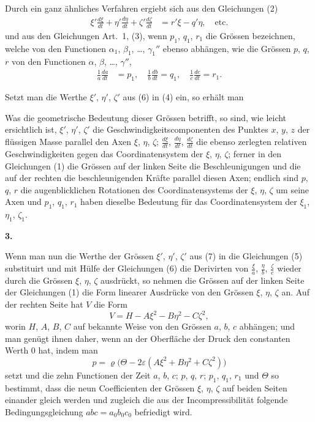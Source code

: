 \documentclass[12pt,a4paper]{book}
\theoremstyle{definition}
\theoremstyle{remark}
\begin{document}
Durch ein ganz \"ahnliches Verfahren ergiebt sich aus den Gleichungen (2)
\begin{align*}
\xi' \frac{d\xi}{dt} + \eta' \frac{d\eta}{dt} + \zeta' \frac{d\zeta}{dt} &= r'\xi - q'\eta,\quad\text{etc.}\tag{5}
\end{align*}
und aus den Gleichungen Art.~1, (3), wenn $p_{1}$, $q_{1}$, $r_{1}$ die Gr\"ossen bezeichnen, welche von den Functionen $\alpha_{1}$, $\beta_{1}$, \dots, $\gamma_{1}''$ ebenso abh\"angen, wie die Gr\"ossen $p$, $q$, $r$ von den Functionen $\alpha$, $\beta$, \dots, $\gamma''$,
\begin{align*}
\frac{1}{a}\frac{da}{dt} &= p_{1},\quad \frac{1}{b}\frac{db}{dt} = q_{1},\quad \frac{1}{c}\frac{dc}{dt} = r_{1}.\tag{6}
\end{align*}

Setzt man die Werthe $\xi'$, $\eta'$, $\zeta'$ aus (6) in (4) ein, so erh\"alt man

Was die geometrische Bedeutung dieser Gr\"ossen betrifft, so sind, wie leicht ersichtlich ist, $\xi'$, $\eta'$, $\zeta'$ die Geschwindigkeitscomponenten des Punktes $x$, $y$, $z$ der fl\"ussigen Masse parallel den Axen $\xi$, $\eta$, $\zeta$; $\frac{d\xi}{dt}$, $\frac{d\eta}{dt}$, $\frac{d\zeta}{dt}$ die ebenso zerlegten relativen Geschwindigkeiten gegen das Coordinatensystem der $\xi$, $\eta$, $\zeta$; ferner in den Gleichungen (1) die Gr\"ossen auf der linken Seite die Beschleunigungen und die auf der rechten die beschleunigenden Kr\"afte parallel diesen Axen; endlich sind $p$, $q$, $r$ die augenblicklichen Rotationen des Coordinatensystems der $\xi$, $\eta$, $\zeta$ um seine Axen und $p_{1}$, $q_{1}$, $r_{1}$ haben dieselbe Bedeutung f\"ur das Coordinatensystem der $\xi_{1}$, $\eta_{1}$, $\zeta_{1}$.

\begin{center}
\textbf{3.}
\end{center}

Wenn man nun die Werthe der Gr\"ossen $\xi'$, $\eta'$, $\zeta'$ aus (7) in die Gleichungen (5) substituirt und mit H\"ulfe der Gleichungen (6) die Derivirten von $\frac{\xi}{a}$, $\frac{\eta}{b}$, $\frac{\zeta}{c}$ wieder durch die Gr\"ossen $\xi$, $\eta$, $\zeta$ ausdr\"uckt, so nehmen die Gr\"ossen auf der linken Seite der Gleichungen (1) die Form linearer Ausdr\"ucke von den Gr\"ossen $\xi$, $\eta$, $\zeta$ an. Auf der rechten Seite hat $V$ die Form
\[
V = H - A\xi^{2} - B\eta^{2} - C\zeta^{2},
\]
worin $H$, $A$, $B$, $C$ auf bekannte Weise von den Gr\"ossen $a$, $b$, $c$ abh\"angen; und man gen\"ugt ihnen daher, wenn an der Oberfl\"ache der Druck den constanten Werth $0$ hat, indem man
\[
p = \varrho\bigl(\Theta - 2\varepsilon(A\xi^{2} + B\eta^{2} + C\zeta^{2})\bigr)
\]
setzt und die zehn Functionen der Zeit $a$, $b$, $c$; $p$, $q$, $r$; $p_{1}$, $q_{1}$, $r_{1}$ und $\Theta$ so bestimmt, dass die neun Coefficienten der Gr\"ossen $\xi$, $\eta$, $\zeta$ auf beiden Seiten einander gleich werden und zugleich die aus der Incompressibilit\"at folgende Bedingungsgleichung $abc = a_{0}b_{0}c_{0}$ befriedigt wird.
\end{document}
